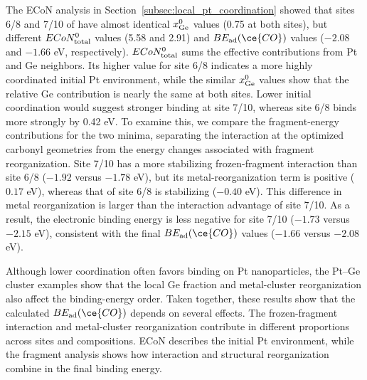 The ECoN analysis in Section~\ref{subsec:local_pt_coordination} showed that sites 6/8 and 7/10 of  have almost identical $x_{\rm Ge}^{0}$ values (0.75 at both sites), but different $ECoN_{\rm total}^{0}$ values (5.58 and 2.91) and $BE_{\rm ad}(\ce{CO})$ values ($-2.08$ and $-1.66$ eV, respectively). $ECoN_{\rm total}^{0}$ sums the effective contributions from Pt and Ge neighbors. Its higher value for site 6/8 indicates a more highly coordinated initial Pt environment, while the similar $x_{\rm Ge}^{0}$ values show that the relative Ge contribution is nearly the same at both sites. Lower initial coordination would suggest stronger binding at site 7/10, whereas site 6/8 binds  more strongly by 0.42 eV. To examine this, we compare the fragment-energy contributions for the two minima, separating the interaction at the optimized carbonyl geometries from the energy changes associated with fragment reorganization. Site 7/10 has a more stabilizing frozen-fragment interaction than site 6/8 ($-1.92$ versus $-1.78$ eV), but its metal-reorganization term is positive ($0.17$ eV), whereas that of site 6/8 is stabilizing ($-0.40$ eV). This difference in metal reorganization is larger than the interaction advantage of site 7/10. As a result, the electronic binding energy is less negative for site 7/10 ($-1.73$ versus $-2.15$ eV), consistent with the final $BE_{\rm ad}(\ce{CO})$ values ($-1.66$ versus $-2.08$ eV).

Although lower coordination often favors  binding on Pt nanoparticles,\cite{hossain:lowcoord:2020} the Pt--Ge cluster examples show that the local Ge fraction and metal-cluster reorganization also affect the binding-energy order. Taken together, these results show that the calculated $BE_{\rm ad}(\ce{CO})$ depends on several effects. The frozen-fragment interaction and metal-cluster reorganization contribute in different proportions across sites and compositions. ECoN describes the initial Pt environment, while the fragment analysis shows how interaction and structural reorganization combine in the final binding energy.
